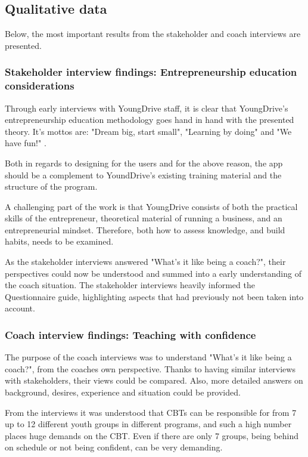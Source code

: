 \subsection{Qualitative data}

Below, the most important results from the stakeholder and coach interviews are presented.

\subsubsection{Stakeholder interview findings: Entrepreneurship education considerations}
Through early interviews with YoungDrive staff, it is clear that YoungDrive's entrepreneurship education methodology goes hand in hand with the presented theory. It's mottos are: "Dream big, start small", "Learning by doing" and "We have fun!" \citep{youngdrive-manual}.

Both in regards to designing for the users and for the above reason, the app should be a complement to YoundDrive's existing training material and the structure of the program.

A challenging part of the work is that YoungDrive consists of both the practical skills of the entrepreneur, theoretical material of running a business, and an entrepreneurial mindset. Therefore, both how to assess knowledge, and build habits, needs to be examined.

As the stakeholder interviews answered "What's it like being a coach?", their perspectives could now be understood and summed into a early understanding of the coach situation. The stakeholder interviews heavily informed the Questionnaire guide, highlighting aspects that had previously not been taken into account.

\subsubsection{Coach interview findings: Teaching with confidence}

The purpose of the coach interviews was to understand "What's it like being a coach?", from the coaches own perspective. Thanks to having similar interviews with stakeholders, their views could be compared. Also, more detailed answers on background, desires, experience and situation could be provided.

 From the interviews it was understood that CBTs can be responsible for from 7 up to 12 different youth groups in different programs, and such a high number places huge demands on the CBT. Even if there are only 7 groups, being behind on schedule or not being confident, can be very demanding.

